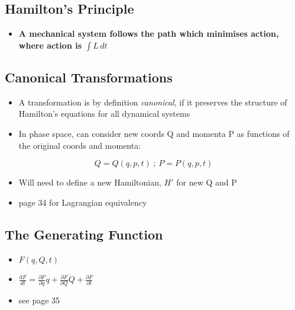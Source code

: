 \documentclass[a4paper,11pt,normalem]{article}
\begin{document}
\section{}\label{lecture-12}

\subsection{Hamilton's Principle}\label{hamiltons-principle-1}

\begin{itemize}
\item
  \textbf{A mechanical system follows the path which minimises action,
  where action is \(\int L\,dt\)}
\end{itemize}

\subsection{Canonical Transformations}\label{canonical-transformations}

\begin{itemize}
\item
  A transformation is by definition \emph{canonical}, if it preserves
  the structure of Hamilton's equations for all dynamical systems
\item
  In phase space, can consider new coords Q and momenta P as functions
  of the original coords and momenta:
\end{itemize}

\[
    Q = Q(q, p, t) ~;~ P = P(q, p, t)
\]

\begin{itemize}
\item
  Will need to define a new Hamiltonian, \(H'\) for new Q and P
\item
  page 34 for Lagrangian equivalency
\end{itemize}

\subsection{The Generating Function}\label{the-generating-function}

\begin{itemize}
\item
  \(F(q, Q, t)\)
\item
  \(\frac{dF}{dt} = \frac{\partial F}{\partial q}\dot{q} + \frac{\partial F}{\partial Q}\dot{Q} + \frac{\partial F}{\partial t}\)
\item
  see page 35
\end{itemize}
\end{document}
